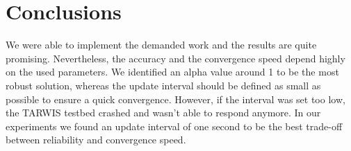 \documentclass{llncs}
\begin{document}
\section{Conclusions}

We were able to implement the demanded work and the results are quite promising. Nevertheless, the accuracy and the convergence speed depend highly on the used parameters. We identified an alpha value around 1 to be the most robust solution, whereas the update interval should be defined as small as possible to ensure a quick convergence. However, if the interval was set too low, the TARWIS testbed crashed and wasn't able to respond anymore. In our experiments we found an update interval of one second to be the best trade-off between reliability and convergence speed. 

{}



%
%
\end{document}
